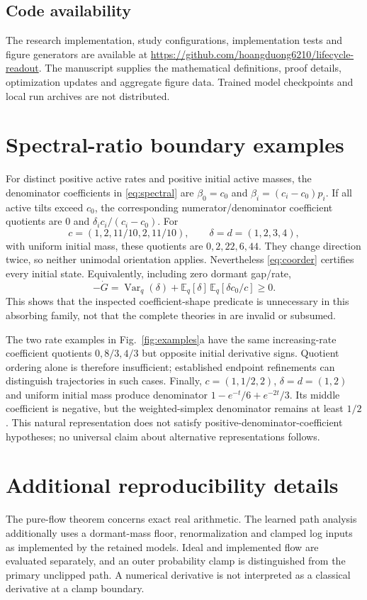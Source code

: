 \documentclass[pdflatex,sn-vancouver-num]{sn-jnl}
\theoremstyle{thmstyleone}
\begin{document}
\subsection*{Code availability}
The research implementation, study configurations, implementation tests and figure generators are available at \url{https://github.com/hoangduong6210/lifecycle-readout}. The manuscript supplies the mathematical definitions, proof details, optimization updates and aggregate figure data. Trained model checkpoints and local run archives are not distributed.
\begin{appendices}
\section{Spectral-ratio boundary examples}\label{app:spectral}
For distinct positive active rates and positive initial active masses, the denominator coefficients in \eqref{eq:spectral} are $\beta_0=c_0$ and $\beta_i=(c_i-c_0)p_i$. If all active tilts exceed $c_0$, the corresponding numerator/denominator coefficient quotients are $0$ and $\delta_i c_i/(c_i-c_0)$. For
\[
c=(1,2,11/10,2,11/10),\qquad \delta=d=(1,2,3,4),
\]
with uniform initial mass, these quotients are $0,2,22,6,44$. They change direction twice, so neither unimodal orientation applies. Nevertheless \eqref{eq:coorder} certifies every initial state. Equivalently, including zero dormant gap/rate,
\[
-\dot G=\operatorname{Var}_q(\delta)
+\mathbb E_q[\delta]\,\mathbb E_q[\delta c_0/c]\ge0.
\]
This shows that the inspected coefficient-shape predicate is unnecessary in this absorbing family, not that the complete theories in \cite{series,karp} are invalid or subsumed.

The two rate examples in Fig.~\ref{fig:examples}a have the same increasing-rate coefficient quotients $0,8/3,4/3$ but opposite initial derivative signs. Quotient ordering alone is therefore insufficient; established endpoint refinements can distinguish trajectories in such cases. Finally, $c=(1,1/2,2)$, $\delta=d=(1,2)$ and uniform initial mass produce denominator
$1-e^{-t}/6+e^{-2t}/3$. Its middle coefficient is negative, but the weighted-simplex denominator remains at least $1/2$. This natural representation does not satisfy positive-denominator-coefficient hypotheses; no universal claim about alternative representations follows.

\section{Additional reproducibility details}\label{app:reproduction}
The pure-flow theorem concerns exact real arithmetic. The learned path analysis additionally uses a dormant-mass floor, renormalization and clamped log inputs as implemented by the retained models. Ideal and implemented flow are evaluated separately, and an outer probability clamp is distinguished from the primary unclipped path. A numerical derivative is not interpreted as a classical derivative at a clamp boundary.


\end{appendices}
\end{document}
